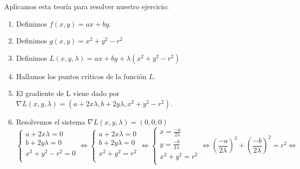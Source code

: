\documentclass{article}
\begin{document}
	Aplicamos esta teoría para resolver nuestro ejercicio:
	
	\begin{enumerate}
		\item Definimos $f(x,y) = ax + by$.
		\item Definimos $g(x,y) = x^2 + y^2 - r^2$
		\item Definimos $L(x,y, \lambda) = ax + by + \lambda(x^2 + y^2 - r^2)$
		\item Hallamos los puntos críticos de la función $L$. 
		\item El gradiente de L viene dado por $\nabla L(x,y,\lambda) = (a + 2x\lambda, b + 2y\lambda, x^2 + y^2 - r^2)$.
		\item Resolvemos el sistema $\nabla L(x, y, \lambda) = (0,0,0)$
		\[
		\begin{cases}
			a + 2x\lambda = 0\\
			b + 2y\lambda = 0\\
			 x^2 + y^2 - r^2 = 0\\
		\end{cases}
		\iff
		\begin{cases}
			a + 2x\lambda = 0\\
			b + 2y\lambda = 0\\
			x^2 + y^2  = r^2 \\
		\end{cases}
		\iff
		\begin{cases}
		x = \frac{-a}{2\lambda}\\
		y = \frac{-b}{2 \lambda}\\
		x^2 + y^2  = r^2 \\
		\end{cases}
		\iff
		(\frac{-a}{2\lambda})^2 + (\frac{-b}{2 \lambda})^2 = r^2 
		\iff 
		\]
		

\end{enumerate}
\end{document}
